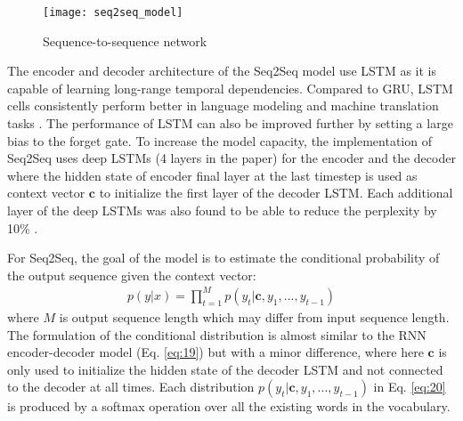 \documentclass[12pt]{extarticle}
\begin{document}
\begin{figure}[ht]
\centering
\texttt{[image: seq2seq\_model]}
\caption{Sequence-to-sequence network}
\label{fig:seq2seq}
\end{figure}

The encoder and decoder architecture of the Seq2Seq model use LSTM as it is capable of learning long-range temporal dependencies. Compared to GRU, LSTM cells consistently perform better in language modeling \citep{Jozefowicz:2015:EER:3045118.3045367} and machine translation tasks \citep{britz-etal-2017-massive}. The performance of LSTM can also be improved further by setting a large bias to the forget gate. To increase the model capacity, the implementation of Seq2Seq uses deep LSTMs (4 layers in the paper) for the encoder and the decoder where the hidden state of encoder final layer at the last timestep is used as context vector $\textbf{c}$ to initialize the first layer of the decoder LSTM. Each additional layer of the deep LSTMs was also found to be able to reduce the perplexity by 10\% \citep{Sutskever:2014:SSL:2969033.2969173}. 

For Seq2Seq, the goal of the model is to estimate the conditional probability of the output sequence given the context vector:
\begin{align}
p(y|x) = \prod_{t=1}^{M} p(y_{t} | \textbf{c}, y_{1},..., y_{t-1})  \label{eq:20}
\end{align}
where $M$ is output sequence length which may differ from input sequence length. The formulation of the conditional distribution is almost similar to the RNN encoder-decoder model (Eq. \ref{eq:19}) but with a minor difference, where here $\textbf{c}$ is only used to initialize the hidden state of the decoder LSTM and not connected to the decoder at all times. Each distribution $p(y_{t} | \textbf{c}, y_{1},..., y_{t-1})$ in Eq. \ref{eq:20} is produced by a softmax operation over all the existing words in the vocabulary.
\end{document}
